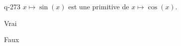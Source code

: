 \begin{truefalse}{q-273}
$x\mapsto \sin(x)$ est une primitive de $x\mapsto \cos(x)$.
\item* Vrai
\item Faux
\end{truefalse}

